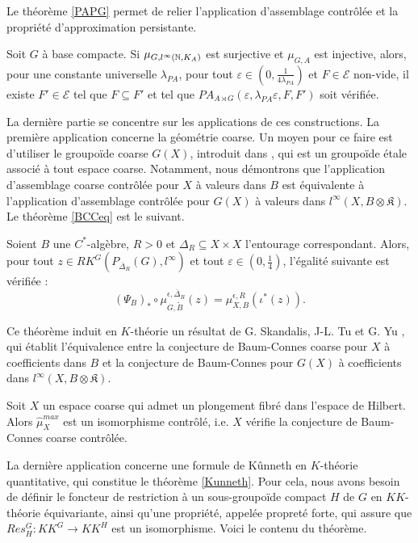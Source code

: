 Le théorème \ref{PAPG} permet de relier l'application d'assemblage contrôlée et la propriété d'approximation persistante. 

\begin{thm} 
Soit $G$ à base compacte. Si $\mu_{G,l^\infty(\mathbb N, K_A)}$ est surjective et $\mu_{G,A}$ est injective, alors, pour une constante universelle $\lambda_{PA}$, pour tout $\varepsilon \in(0,\frac{1}{4\lambda_{PA}})$ et $F\in\mathcal E$ non-vide, il existe $F'\in\mathcal E$ tel que $F\subseteq F'$ et tel que $PA_{A\rtimes G}(\varepsilon,\lambda_{PA}\varepsilon,F,F')$ soit vérifiée.
\end{thm}

La dernière partie se concentre sur les applications de ces constructions. La première application concerne la géométrie coarse. Un moyen pour ce faire est d'utiliser le groupoïde coarse $G(X)$, introduit dans \cite{SkTuYu}, qui est un groupoïde étale associé à tout espace coarse. Notamment, nous démontrons que l'application d'assemblage coarse contrôlée pour $X$ à valeurs dans $B$ est équivalente à l'application d'assemblage contrôlée pour $G(X)$ à valeurs dans $l^\infty(X,B\otimes\mathfrak K)$. Le théorème \ref{BCCeq} est le suivant.

\begin{thm}
Soient $B$ une $C^*$-algèbre, $R>0$ et $\Delta_R\subseteq X\times X$ l'entourage correspondant. Alors, pour tout $z\in RK^G(P_{\overline \Delta_R}(G),l^\infty)$ et tout $\varepsilon\in(0,\frac{1}{4})$, l'égalité suivante est vérifiée :
\[(\Psi_B)_*\circ\mu^{\epsilon,\overline\Delta_R}_{G,\tilde B} (z) = \mu_{X,B}^{\epsilon,R}(\iota^*(z)).\]
\end{thm}

Ce théorème induit en $K$-théorie un résultat de G. Skandalis, J-L. Tu et G. Yu \cite{SkTuYu}, qui établit l'équivalence entre la conjecture de Baum-Connes coarse pour $X$ à coefficients dans $B$ et la conjecture de Baum-Connes pour $G(X)$ à coefficients dans $l^\infty(X,B\otimes \mathfrak K)$. \\

\begin{cor}
Soit $X$ un espace coarse qui admet un plongement fibré dans l'espace de Hilbert. Alors $\hat \mu_{X}^{max}$ est un isomorphisme contrôlé, i.e. $X$ vérifie la conjecture de Baum-Connes coarse contrôlée.
\end{cor}

La dernière application concerne une formule de Kûnneth en $K$-théorie quantitative, qui constitue le théorème \ref{Kunneth}. Pour cela, nous avons besoin de définir le foncteur de restriction à un sous-groupoïde compact $H$ de $G$ en $KK$-théorie équivariante, ainsi qu'une propriété, appelée propreté forte, qui assure que $Res_H^G : KK^G \rightarrow KK^H$ est un isomorphisme. Voici le contenu du théorème.

